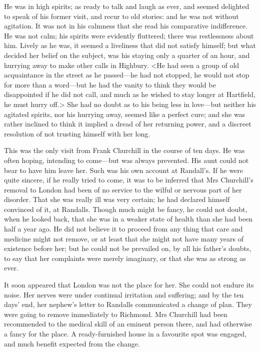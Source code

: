 He was in high spirits; as ready to talk and laugh as ever, and seemed delighted to speak of his former visit, and recur to old stories: and he was not without agitation. It was not in his calmness that she read his comparative indifference. He was not calm; his spirits were evidently fluttered; there was restlessness about him. Lively as he was, it seemed a liveliness that did not satisfy himself; but what decided her belief on the subject, was his staying only a quarter of an hour, and hurrying away to make other calls in Highbury. <He had seen a group of old acquaintance in the street as he passed—he had not stopped, he would not stop for more than a word—but he had the vanity to think they would be disappointed if he did not call, and much as he wished to stay longer at Hartfield, he must hurry off.> She had no doubt as to his being less in love—but neither his agitated spirits, nor his hurrying away, seemed like a perfect cure; and she was rather inclined to think it implied a dread of her returning power, and a discreet resolution of not trusting himself with her long.

This was the only visit from Frank Churchill in the course of ten days. He was often hoping, intending to come—but was always prevented. His aunt could not bear to have him leave her. Such was his own account at Randall's. If he were quite sincere, if he really tried to come, it was to be inferred that Mrs Churchill's removal to London had been of no service to the wilful or nervous part of her disorder. That she was really ill was very certain; he had declared himself convinced of it, at Randalls. Though much might be fancy, he could not doubt, when he looked back, that she was in a weaker state of health than she had been half a year ago. He did not believe it to proceed from any thing that care and medicine might not remove, or at least that she might not have many years of existence before her; but he could not be prevailed on, by all his father's doubts, to say that her complaints were merely imaginary, or that she was as strong as ever.

It soon appeared that London was not the place for her. She could not endure its noise. Her nerves were under continual irritation and suffering; and by the ten days' end, her nephew's letter to Randalls communicated a change of plan. They were going to remove immediately to Richmond. Mrs Churchill had been recommended to the medical skill of an eminent person there, and had otherwise a fancy for the place. A ready-furnished house in a favourite spot was engaged, and much benefit expected from the change.

